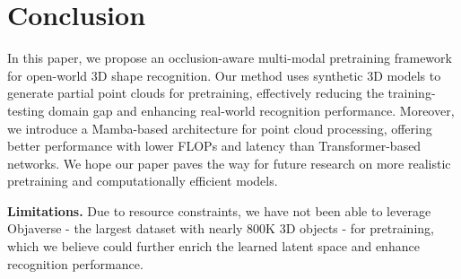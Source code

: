 \vspace{-3mm}
\section{Conclusion}
\label{sec:conclusion}
In this paper, we propose an occlusion-aware multi-modal pretraining framework for open-world 3D shape recognition. Our method uses synthetic 3D models to generate partial point clouds for pretraining, effectively reducing the training-testing domain gap and enhancing real-world recognition performance. Moreover, we introduce a Mamba-based architecture for point cloud processing, offering better performance with lower FLOPs and latency than Transformer-based networks. We hope our paper paves the way for future research on more realistic pretraining and computationally efficient models.

\vspace{1mm}
\noindent\textbf{Limitations.} Due to resource constraints, we have not been able to leverage Objaverse \cite{objaverse} - the largest dataset with nearly 800K 3D objects - for pretraining, which we believe could further enrich the learned latent space and enhance recognition performance. 